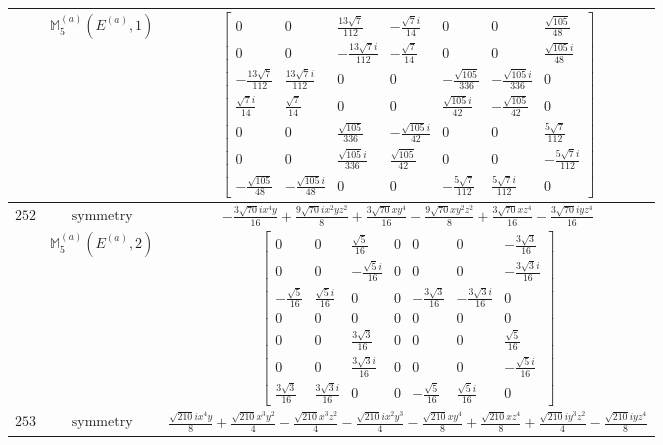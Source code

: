 \documentclass[fleqn,8pt,landscape]{jsarticle}
\begin{document}
\begin{longtable}{ccc}
$  $ & $ \mathbb{M}_{5}^{(a)}(E^{(a)},1) $ & $ \begin{bmatrix} 0 & 0 & \frac{13 \sqrt{7}}{112} & - \frac{\sqrt{7} i}{14} & 0 & 0 & \frac{\sqrt{105}}{48} \\ 0 & 0 & - \frac{13 \sqrt{7} i}{112} & - \frac{\sqrt{7}}{14} & 0 & 0 & \frac{\sqrt{105} i}{48} \\ - \frac{13 \sqrt{7}}{112} & \frac{13 \sqrt{7} i}{112} & 0 & 0 & - \frac{\sqrt{105}}{336} & - \frac{\sqrt{105} i}{336} & 0 \\ \frac{\sqrt{7} i}{14} & \frac{\sqrt{7}}{14} & 0 & 0 & \frac{\sqrt{105} i}{42} & - \frac{\sqrt{105}}{42} & 0 \\ 0 & 0 & \frac{\sqrt{105}}{336} & - \frac{\sqrt{105} i}{42} & 0 & 0 & \frac{5 \sqrt{7}}{112} \\ 0 & 0 & \frac{\sqrt{105} i}{336} & \frac{\sqrt{105}}{42} & 0 & 0 & - \frac{5 \sqrt{7} i}{112} \\ - \frac{\sqrt{105}}{48} & - \frac{\sqrt{105} i}{48} & 0 & 0 & - \frac{5 \sqrt{7}}{112} & \frac{5 \sqrt{7} i}{112} & 0 \end{bmatrix} $ \\ \hline
$ 252 $ & $ \text{symmetry} $ & $ - \frac{3 \sqrt{70} i x^{4} y}{16} + \frac{9 \sqrt{70} i x^{2} y z^{2}}{8} + \frac{3 \sqrt{70} x y^{4}}{16} - \frac{9 \sqrt{70} x y^{2} z^{2}}{8} + \frac{3 \sqrt{70} x z^{4}}{16} - \frac{3 \sqrt{70} i y z^{4}}{16} $ \\
$  $ & $ \mathbb{M}_{5}^{(a)}(E^{(a)},2) $ & $ \begin{bmatrix} 0 & 0 & \frac{\sqrt{5}}{16} & 0 & 0 & 0 & - \frac{3 \sqrt{3}}{16} \\ 0 & 0 & - \frac{\sqrt{5} i}{16} & 0 & 0 & 0 & - \frac{3 \sqrt{3} i}{16} \\ - \frac{\sqrt{5}}{16} & \frac{\sqrt{5} i}{16} & 0 & 0 & - \frac{3 \sqrt{3}}{16} & - \frac{3 \sqrt{3} i}{16} & 0 \\ 0 & 0 & 0 & 0 & 0 & 0 & 0 \\ 0 & 0 & \frac{3 \sqrt{3}}{16} & 0 & 0 & 0 & \frac{\sqrt{5}}{16} \\ 0 & 0 & \frac{3 \sqrt{3} i}{16} & 0 & 0 & 0 & - \frac{\sqrt{5} i}{16} \\ \frac{3 \sqrt{3}}{16} & \frac{3 \sqrt{3} i}{16} & 0 & 0 & - \frac{\sqrt{5}}{16} & \frac{\sqrt{5} i}{16} & 0 \end{bmatrix} $ \\ \hline
$ 253 $ & $ \text{symmetry} $ & $ \frac{\sqrt{210} i x^{4} y}{8} + \frac{\sqrt{210} x^{3} y^{2}}{4} - \frac{\sqrt{210} x^{3} z^{2}}{4} - \frac{\sqrt{210} i x^{2} y^{3}}{4} - \frac{\sqrt{210} x y^{4}}{8} + \frac{\sqrt{210} x z^{4}}{8} + \frac{\sqrt{210} i y^{3} z^{2}}{4} - \frac{\sqrt{210} i y z^{4}}{8} $ \\

\end{longtable}
\end{document}
